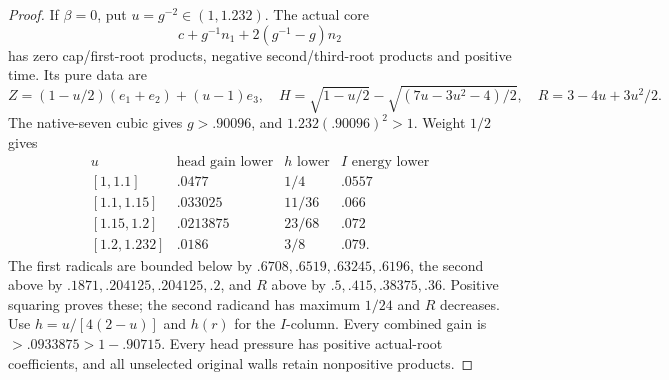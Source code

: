 \documentclass[11pt]{article}
\theoremstyle{definition}
\theoremstyle{remark}
\begin{document}
\begin{proof}
If \(\beta=0\), put \(u=g^{-2}\in(1,1.232)\). The actual core
\[
 c+g^{-1}n_1+2(g^{-1}-g)n_2
\]
has zero cap/first-root products, negative second/third-root products
and positive time. Its pure data are
\[
 Z=(1-u/2)(e_1+e_2)+(u-1)e_3,\quad
 H=\sqrt{1-u/2}-\sqrt{(7u-3u^2-4)/2},\quad
 R=3-4u+3u^2/2.
\]
The native-seven cubic gives \(g>.90096\), and
\(1.232(.90096)^2>1\). Weight \(1/2\) gives
\[
\begin{array}{c|c|c|c}
u&\text{head gain lower}&h\text{ lower}&I\text{ energy lower}\\ \hline
{}[1,1.1]&.0477&1/4&.0557\\
{}[1.1,1.15]&.033025&11/36&.066\\
{}[1.15,1.2]&.0213875&23/68&.072\\
{}[1.2,1.232]&.0186&3/8&.079 .
\end{array}
\]
The first radicals are bounded below by
\(.6708,\allowbreak .6519,\allowbreak .63245,\allowbreak .6196\), the second above by
\(.1871,\allowbreak .204125,\allowbreak .204125,\allowbreak .2\), and \(R\) above by
\(.5,\allowbreak .415,\allowbreak .38375,\allowbreak .36\). Positive squaring proves these;
the second radicand has maximum \(1/24\) and \(R\) decreases.
Use \(h=u/[4(2-u)]\) and \(h(r)\) for the \(I\)-column.
Every combined gain is \(>.0933875>1-.90715\).
Every head pressure has positive actual-root coefficients, and all
unselected original walls retain nonpositive products.
\end{proof}
\end{document}
